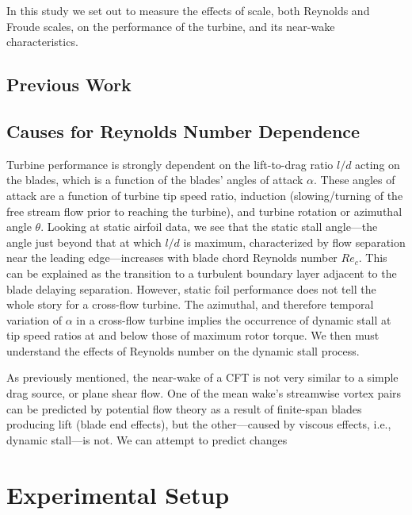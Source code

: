 \documentclass[energies,article,accept,moreauthors,pdftex,12pt,a4paper]{mdpi}
\begin{document}
In this study we set out to measure the effects of scale, both Reynolds and
Froude scales, on the performance of the turbine, and its near-wake
characteristics.

\subsection{Previous Work}

\subsection{Causes for Reynolds Number Dependence}

Turbine performance is strongly dependent on the lift-to-drag ratio $l/d$ acting
on the blades, which is a function of the blades' angles of attack $\alpha$.
These angles of attack are a function of turbine tip speed ratio, induction
(slowing/turning of the free stream flow prior to reaching the turbine), and
turbine rotation or azimuthal angle $\theta$. Looking at static airfoil data, we
see that the static stall angle---the angle just beyond that at which $l/d$ is
maximum, characterized by flow separation near the leading edge---increases with
blade chord Reynolds number $Re_c$. This can be explained as the transition to a
turbulent boundary layer adjacent to the blade delaying separation. However,
static foil performance does not tell the whole story for a cross-flow turbine.
The azimuthal, and therefore temporal variation of $\alpha$ in a cross-flow
turbine implies the occurrence of dynamic stall at tip speed ratios at and below
those of maximum rotor torque\cite{Para2002}. We then must understand the
effects of Reynolds number on the dynamic stall process.

As previously mentioned, the near-wake of a CFT is not very similar to a simple
drag source, or plane shear flow. One of the mean wake's streamwise vortex pairs
can be predicted by potential flow theory as a result of finite-span blades
producing lift (blade end effects), but the other---caused by viscous effects,
i.e., dynamic stall---is not. We can attempt to predict changes

\section{Experimental Setup}
\end{document}
